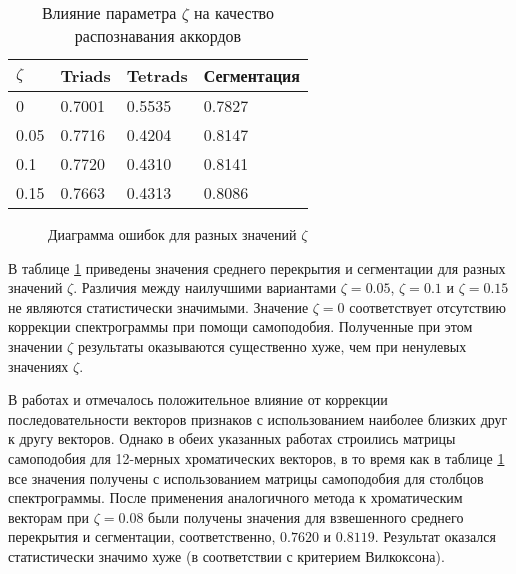\begin{table} [htbp]
  \centering
  \parbox{15cm}{\caption{Влияние параметра $\zeta$ на качество распознавания
  аккордов} \label{Tzeta}}
  \begin{tabular}{|l|l|l|l|}
  \hline
  $\zeta$ & Triads & Tetrads & Сегментация \\
  \hline
  0 & 0.7001 & 0.5535 & 0.7827 \\
  0.05 & 0.7716 & 0.4204 & 0.8147 \\
  0.1 & 0.7720 & 0.4310 & 0.8141 \\
  0.15 & 0.7663 & 0.4313 & 0.8086 \\
  \hline
  \end{tabular}
\end{table}

\begin{figure}[h]
  \begin{minipage}[h]{0.49\linewidth}
  \end{minipage}
  \hfill
  \begin{minipage}[h]{0.49\linewidth}
  \end{minipage}
  \caption{Диаграмма ошибок для разных значений $\zeta$}
  \label{img:zeta}
\end{figure}

В таблице \ref{Tzeta} приведены значения среднего перекрытия и сегментации для
разных значений $\zeta$. Различия между наилучшими вариантами $\zeta=0.05$,
$\zeta=0.1$ и $\zeta=0.15$ не являются статистически значимыми. Значение
$\zeta=0$ соответствует отсутствию коррекции спектрограммы при помощи
самоподобия. Полученные при этом значении $\zeta$ результаты оказываются
существенно хуже, чем при ненулевых значениях $\zeta$.

В работах \cite{Mauch2010} и \cite{Cho2011} отмечалось положительное влияние от
коррекции последовательности векторов признаков с использованием наиболее
близких друг к другу векторов. Однако в обеих указанных работах строились
матрицы самоподобия для 12-мерных хроматических векторов, в то время как в
таблице \ref{Tzeta} все значения получены с использованием матрицы самоподобия
для столбцов спектрограммы. После применения аналогичного метода к хроматическим
векторам при $\zeta=0.08$ были получены значения для взвешенного среднего
перекрытия и сегментации, соответственно, $0.7620$ и $0.8119$. Результат
оказался статистически значимо хуже (в соответствии с критерием Вилкоксона).

